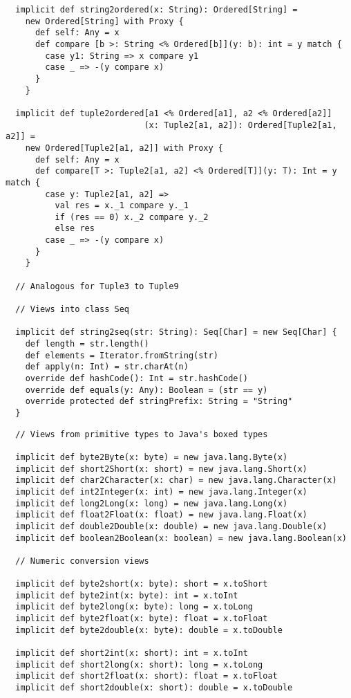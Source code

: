 {\begin{lstlisting}
  implicit def string2ordered(x: String): Ordered[String] = 
    new Ordered[String] with Proxy {
      def self: Any = x
      def compare [b >: String <% Ordered[b]](y: b): int = y match {
        case y1: String => x compare y1
        case _ => -(y compare x)
      }
    }

  implicit def tuple2ordered[a1 <% Ordered[a1], a2 <% Ordered[a2]]
                            (x: Tuple2[a1, a2]): Ordered[Tuple2[a1, a2]] = 
    new Ordered[Tuple2[a1, a2]] with Proxy {
      def self: Any = x
      def compare[T >: Tuple2[a1, a2] <% Ordered[T]](y: T): Int = y match {
        case y: Tuple2[a1, a2] => 
          val res = x._1 compare y._1
          if (res == 0) x._2 compare y._2
          else res
        case _ => -(y compare x)
      }
    }

  // Analogous for Tuple3 to Tuple9

  // Views into class Seq

  implicit def string2seq(str: String): Seq[Char] = new Seq[Char] {
    def length = str.length()
    def elements = Iterator.fromString(str)
    def apply(n: Int) = str.charAt(n)
    override def hashCode(): Int = str.hashCode()
    override def equals(y: Any): Boolean = (str == y)
    override protected def stringPrefix: String = "String"
  }
\end{lstlisting}
\newpage
\begin{lstlisting}
  // Views from primitive types to Java's boxed types

  implicit def byte2Byte(x: byte) = new java.lang.Byte(x)
  implicit def short2Short(x: short) = new java.lang.Short(x)
  implicit def char2Character(x: char) = new java.lang.Character(x)
  implicit def int2Integer(x: int) = new java.lang.Integer(x)
  implicit def long2Long(x: long) = new java.lang.Long(x)
  implicit def float2Float(x: float) = new java.lang.Float(x)
  implicit def double2Double(x: double) = new java.lang.Double(x)
  implicit def boolean2Boolean(x: boolean) = new java.lang.Boolean(x)

  // Numeric conversion views

  implicit def byte2short(x: byte): short = x.toShort
  implicit def byte2int(x: byte): int = x.toInt
  implicit def byte2long(x: byte): long = x.toLong
  implicit def byte2float(x: byte): float = x.toFloat
  implicit def byte2double(x: byte): double = x.toDouble

  implicit def short2int(x: short): int = x.toInt
  implicit def short2long(x: short): long = x.toLong
  implicit def short2float(x: short): float = x.toFloat
  implicit def short2double(x: short): double = x.toDouble


\end{lstlisting}}
